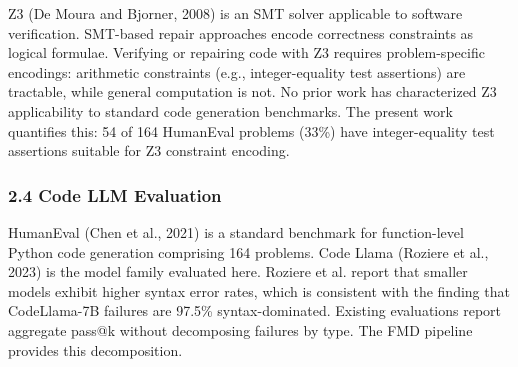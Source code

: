 Z3 (De Moura and Bjorner, 2008) is an SMT solver applicable to software verification. SMT-based repair approaches encode correctness constraints as logical formulae. Verifying or repairing code with Z3 requires problem-specific encodings: arithmetic constraints (e.g., integer-equality test assertions) are tractable, while general computation is not. No prior work has characterized Z3 applicability to standard code generation benchmarks. The present work quantifies this: 54 of 164 HumanEval problems (33\%) have integer-equality test assertions suitable for Z3 constraint encoding.

\subsubsection{2.4 Code LLM Evaluation}

HumanEval (Chen et al., 2021) is a standard benchmark for function-level Python code generation comprising 164 problems. Code Llama (Roziere et al., 2023) is the model family evaluated here. Roziere et al. report that smaller models exhibit higher syntax error rates, which is consistent with the finding that CodeLlama-7B failures are 97.5\% syntax-dominated. Existing evaluations report aggregate pass@k without decomposing failures by type. The FMD pipeline provides this decomposition.
